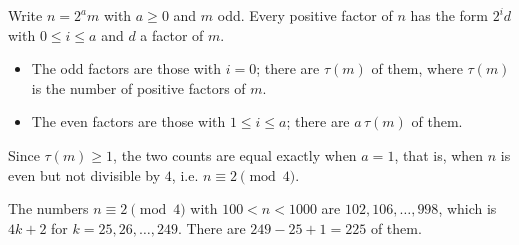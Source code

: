 Write $n=2^a m$ with $a\ge0$ and $m$ odd. Every positive factor of $n$ has the form $2^i d$ with $0\le i\le a$ and $d$ a factor of $m$.

\begin{itemize}
\item The odd factors are those with $i=0$; there are $\tau(m)$ of them, where $\tau(m)$ is the number of positive factors of $m$.
\item The even factors are those with $1\le i\le a$; there are $a\,\tau(m)$ of them.
\end{itemize}
Since $\tau(m)\ge1$, the two counts are equal exactly when $a=1$, that is, when $n$ is even but not divisible by $4$, i.e. $n\equiv2\pmod4$.

The numbers $n\equiv2\pmod 4$ with $100<n<1000$ are $102,106,\dots,998$, which is $4k+2$ for $k=25,26,\dots,249$. There are $249-25+1=\boxed{225}$ of them.

